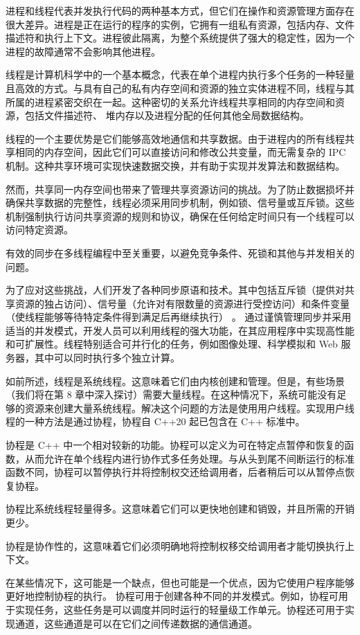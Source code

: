 
进程和线程代表并发执行代码的两种基本方式，但它们在操作和资源管理方面存在很大差异。进程是正在运行的程序的实例，它拥有一组私有资源，包括内存、文件描述符和执行上下文。进程彼此隔离，为整个系统提供了强大的稳定性，因为一个进程的故障通常不会影响其他进程。

线程是计算机科学中的一个基本概念，代表在单个进程内执行多个任务的一种轻量且高效的方式。与具有自己的私有内存空间和资源的独立实体进程不同，线程与其所属的进程紧密交织在一起。这种密切的关系允许线程共享相同的内存空间和资源，包括文件描述符、 堆内存以及进程分配的任何其他全局数据结构。

线程的一个主要优势是它们能够高效地通信和共享数据。由于进程内的所有线程共享相同的内存空间，因此它们可以直接访问和修改公共变量，而无需复杂的 IPC 机制。这种共享环境可实现快速数据交换，并有助于实现并发算法和数据结构。

然而，共享同一内存空间也带来了管理共享资源访问的挑战。为了防止数据损坏并确保共享数据的完整性，线程必须采用同步机制，例如锁、信号量或互斥锁。这些机制强制执行访问共享资源的规则和协议，确保在任何给定时间只有一个线程可以访问特定资源。

有效的同步在多线程编程中至关重要，以避免竞争条件、死锁和其他与并发相关的问题。

为了应对这些挑战，人们开发了各种同步原语和技术。其中包括互斥锁（提供对共享资源的独占访问）、信号量（允许对有限数量的资源进行受控访问）和条件变量（使线程能够等待特定条件得到满足后再继续执行）
。
通过谨慎管理同步并采用适当的并发模式，开发人员可以利用线程的强大功能，在其应用程序中实现高性能和可扩展性。线程特别适合可并行化的任务，例如图像处理、科学模拟和 Web 服务器，其中可以同时执行多个独立计算。

如前所述，线程是系统线程。这意味着它们由内核创建和管理。但是，有些场景（我们将在第 8 章中深入探讨）需要大量线程。在这种情况下，系统可能没有足够的资源来创建大量系统线程。解决这个问题的方法是使用用户线程。实现用户线程的一种方法是通过协程，协程自 C++20 起已包含在 C++ 标准中。

协程是 C++ 中一个相对较新的功能。协程可以定义为可在特定点暂停和恢复的函数，从而允许在单个线程内进行协作式多任务处理。与从头到尾不间断运行的标准函数不同，协程可以暂停执行并将控制权交还给调用者，后者稍后可以从暂停点恢复协程。

协程比系统线程轻量得多。这意味着它们可以更快地创建和销毁，并且所需的开销更少。

协程是协作性的，这意味着它们必须明确地将控制权移交给调用者才能切换执行上下文。

在某些情况下，这可能是一个缺点，但也可能是一个优点，因为它使用户程序能够更好地控制协程的执行。
协程可用于创建各种不同的并发模式。例如，协程可用于实现任务，这些任务是可以调度并同时运行的轻量级工作单元。协程还可用于实现通道，这些通道是可以在它们之间传递数据的通信通道。

